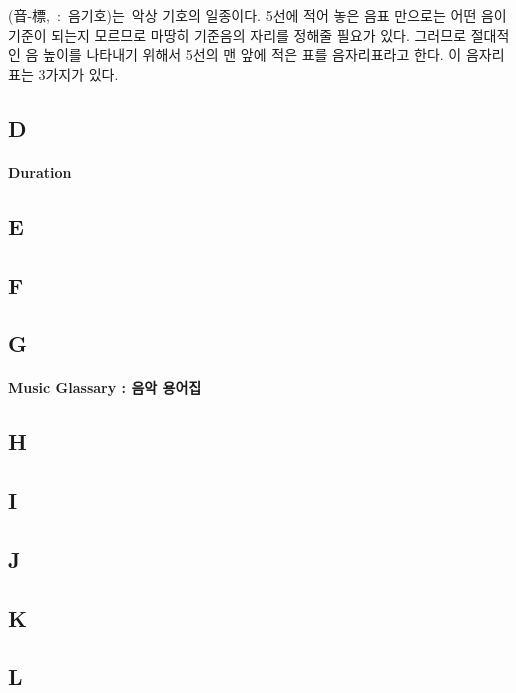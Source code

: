 \documentclass[12pt, a4paper, oneside]{book}
\begin{document}
(音-標, : 음기호)는 악상 기호의 일종이다. 
5선에 적어 놓은 음표 만으로는 어떤 음이 기준이 되는지 모르므로 마땅히 기준음의 자리를 정해줄 필요가 있다. 
그러므로 절대적인 음 높이를 나타내기 위해서 5선의 맨 앞에 적은 표를 음자리표라고 한다. 
이 음자리표는 3가지가 있다.

	\subsection{D}

\paragraph{Duration}


	\subsection{E}

	\subsection{F}

	\subsection{G}

\paragraph{Music Glassary : 음악 용어집}



	\subsection{H}

	\subsection{I}


	\subsection{J}


	\subsection{K}

	\subsection{L}
\end{document}
